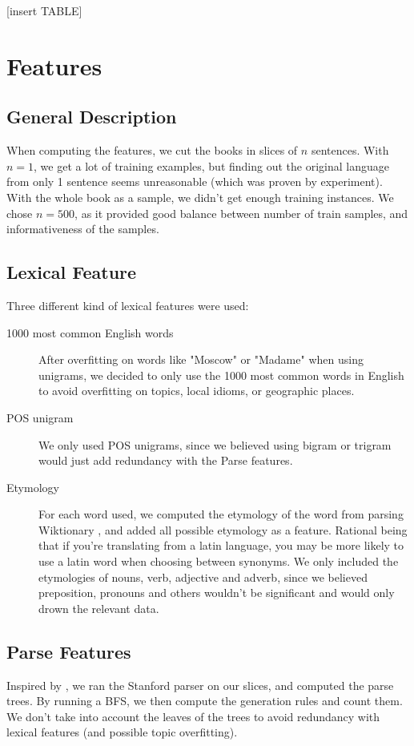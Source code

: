 \documentclass[10pt]{article}
\begin{document}
[insert TABLE]

\section{Features}
\subsection{General Description}
When computing the features, we cut the books in slices of $n$ sentences. With $n=1$, we get a lot of training examples, but finding out the original language from only 1 sentence seems unreasonable (which was proven by experiment). With the whole book as a sample, we didn't get enough training instances. We chose $n=500$, as it provided good balance between number of train samples, and informativeness of the samples.
\subsection{Lexical Feature}
Three different kind of lexical features were used:
\begin{description}
\item[1000 most common English words] After overfitting on words like "Moscow" or "Madame" when using unigrams, we decided to only use the 1000 most common words in English to avoid overfitting on topics, local idioms, or geographic places.
\item[POS unigram] We only used POS unigrams, since we believed using bigram or trigram would just add redundancy with the Parse features.
\item[Etymology] For each word used, we computed the etymology of the word from parsing Wiktionary \cite{Wiktionary}, and added all possible etymology as a feature. Rational being that if you're translating from a latin language, you may be more likely to use a latin word when choosing between synonyms. We only included the etymologies of nouns, verb, adjective and adverb, since we believed preposition, pronouns  and others wouldn't be significant and would only drown the relevant data.
\end{description}

\subsection{Parse Features}
Inspired by \cite{Parse}, we ran the Stanford parser on our slices, and computed the parse trees. By running a BFS, we then compute the generation rules and count them. We don't take into account the leaves of the trees to avoid redundancy with lexical features (and possible topic overfitting).
\end{document}
